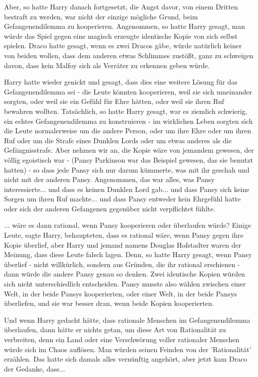 Aber, so hatte Harry danach fortgesetzt, die Angst davor, von einem Dritten
bestraft zu werden, war nicht der einzige mögliche Grund, beim Gefangenendilemma
zu kooperieren. Angenommen, so hatte Harry gesagt, man würde das Spiel gegen
eine magisch erzeugte identische Kopie von sich selbst spielen. Draco hatte
gesagt, wenn es zwei Dracos gäbe, würde natürlich keiner von beiden wollen, dass
dem anderen etwas Schlimmes zustößt, ganz zu schweigen davon, dass kein Malfoy
sich als Verräter zu erkennen geben würde.

Harry hatte wieder genickt und gesagt, dass dies eine weitere Lösung für das
Gefangenendilemma sei - die Leute könnten kooperieren, weil sie sich umeinander
sorgten, oder weil sie ein Gefühl für Ehre hätten, oder weil sie ihren Ruf
bewahren wollten. Tatsächlich, so hatte Harry gesagt, war es ziemlich schwierig,
ein echtes Gefangenendilemma zu konstruieren - im wirklichen Leben sorgten sich
die Leute normalerweise um die andere Person, oder um ihre Ehre oder um ihren
Ruf oder um die Strafe eines Dunklen Lords oder um etwas anderes als die
Gefängnisstrafe. Aber nehmen wir an, die Kopie wäre von jemandem gewesen, der
völlig egoistisch war - (Pansy Parkinson war das Beispiel gewesen, das sie
benutzt hatten) - so dass jede Pansy sich nur darum kümmerte, was mit ihr
geschah und nicht mit der anderen Pansy. Angenommen, das war alles, was Pansy
interessierte... und dass es keinen Dunklen Lord gab... und dass Pansy sich
keine Sorgen um ihren Ruf machte... und dass Pansy entweder kein Ehrgefühl hatte
oder sich der anderen Gefangenen gegenüber nicht verpflichtet fühlte.

... wäre es dann rational, wenn Pansy kooperieren oder überlaufen würde? Einige
Leute, sagte Harry, behaupteten, dass es rational wäre, wenn Pansy gegen ihre
Kopie überlief, aber Harry und jemand namens Douglas Hofstadter waren der
Meinung, dass diese Leute falsch lagen. Denn, so hatte Harry gesagt, wenn Pansy
überlief - nicht willkürlich, sondern aus Gründen, die ihr rational erschienen -
dann würde die andere Pansy genau so denken. Zwei identische Kopien würden sich
nicht unterschiedlich entscheiden. Pansy musste also wählen zwischen einer Welt,
in der beide Pansys kooperierten, oder einer Welt, in der beide Pansys
überliefen, und sie war besser dran, wenn beide Kopien kooperierten.

Und wenn Harry gedacht hätte, dass \glqq{}rationale\grqq{} Menschen im
Gefangenendilemma überlaufen, dann hätte er nichts getan, um diese Art von \glqq{}
Rationalität\grqq{} zu verbreiten, denn ein Land oder eine Verschwörung voller
\glqq{}rationaler\grqq{} Menschen würde sich im Chaos auflösen. Man würden seinen
Feinden von der 'Rationalität' erzählen. Das hatte sich damals alles vernünftig
angehört, aber jetzt kam Draco der Gedanke, dass...

